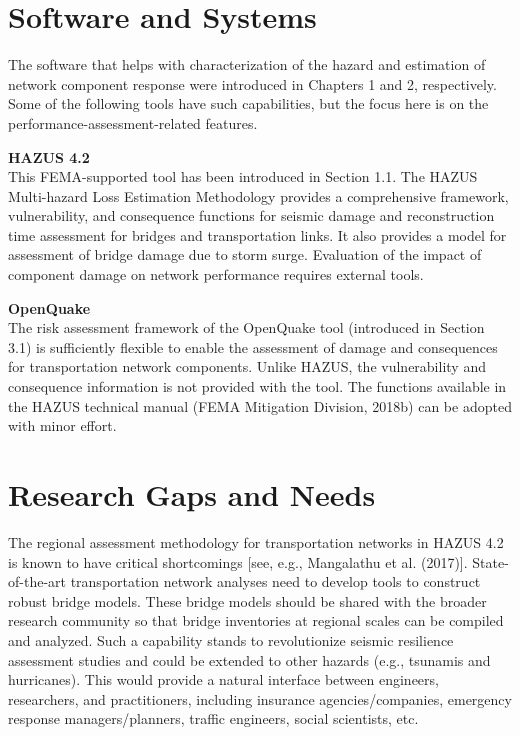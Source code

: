 \section{Software and Systems}
\label{sec:perf_transport_tools}

The software that helps with characterization of the hazard and estimation of network component response were introduced in Chapters 1 and 2, respectively. Some of the following tools have such capabilities, but the focus here is on the performance-assessment-related features.
\newline

\noindent\textbf{HAZUS 4.2} \\This FEMA-supported tool has been introduced in Section 1.1. The HAZUS Multi-hazard Loss Estimation Methodology provides a comprehensive framework, vulnerability, and consequence functions for seismic damage and reconstruction time assessment for bridges and transportation links. It also provides a model for assessment of bridge damage due to storm surge. Evaluation of the impact of component damage on network performance requires external tools.
\newline

\noindent\textbf{OpenQuake} \\The risk assessment framework of the OpenQuake tool (introduced in Section 3.1) is sufficiently flexible to enable the assessment of damage and consequences for transportation network components. Unlike HAZUS, the vulnerability and consequence information is not provided with the tool. The functions available in the HAZUS technical manual (FEMA Mitigation Division, 2018b) can be adopted with minor effort.

\section{Research Gaps and Needs}
\label{sec:perf_transport_gaps}

The regional assessment methodology for transportation networks in HAZUS 4.2 is known to have critical shortcomings [see, e.g., Mangalathu et al. (2017)]. State-of-the-art transportation network analyses need to develop tools to construct robust bridge models. These bridge models should be shared with the broader research community so that bridge inventories at regional scales can be compiled and analyzed. Such a capability stands to revolutionize seismic resilience assessment studies and could be extended to other hazards (e.g., tsunamis and hurricanes). This would provide a natural interface between engineers, researchers, and practitioners, including insurance agencies/companies, emergency response managers/planners, traffic engineers, social scientists, etc. 

